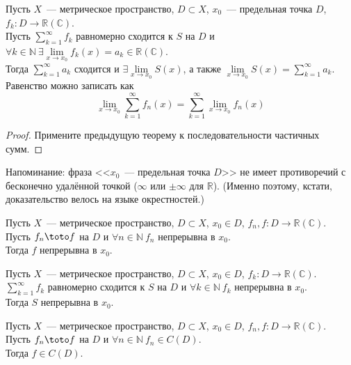 \documentclass{article}
\begin{document}
    \begin{theorem}
        Пусть $X$~--- метрическое пространство, $D\subset X$, $x_0$~--- предельная точка $D$, $f_k\colon D\to\mathbb R(\mathbb C)$.\\
        Пусть $\sum\limits_{k=1}^\infty f_k$ равномерно сходится к $S$ на $D$ и $\forall k\in\mathbb N~\exists\lim\limits_{x\to x_0}f_k(x)=a_k\in\mathbb R(\mathbb C)$.\\
        Тогда $\sum\limits_{k=1}^\infty a_k$ сходится и $\exists\lim\limits_{x\to x_0}S(x)$, а также $\lim\limits_{x\to x_0}S(x)=\sum\limits_{k=1}^\infty a_k$. Равенство можно записать как
        $$
        \lim\limits_{x\to x_0}\sum\limits_{k=1}^\infty f_n(x)=\sum\limits_{k=1}^\infty\lim\limits_{x\to x_0}f_n(x)
        $$
    \end{theorem}
    \begin{proof}
        Примените предыдущую теорему к последовательности частичных сумм.
    \end{proof}
    \begin{remark}
        Напоминание: фраза <<$x_0$~--- предельная точка $D$>> не имеет противоречий с бесконечно удалённой точкой ($\infty$ или $\pm\infty$ для $\mathbb R$). (Именно поэтому, кстати, доказательство велось на языке окрестностей.)
    \end{remark}
    \begin{corollary}
        \label{Непрерывность предельной функции в точке}
        Пусть $X$~--- метрическое пространство, $D\subset X$, $x_0\in D$, $f_n,f\colon D\to\mathbb R(\mathbb C)$.\\
        Пусть $f_n\toto f$ на $D$ и $\forall n\in\mathbb N~f_n$ непрерывна в $x_0$.\\
        Тогда $f$ непрерывна в $x_0$.
    \end{corollary}
    \begin{corollary}
        \label{Непрерывность cуммы ряда в точке}
        Пусть $X$~--- метрическое пространство, $D\subset X$, $x_0\in D$, $f_k\colon D\to\mathbb R(\mathbb C)$.\\
        $\sum\limits_{k=1}^\infty f_k$ равномерно сходится к $S$ на $D$ и $\forall k\in\mathbb N~f_k$ непрерывна в $x_0$.\\
        Тогда $S$ непрерывна в $x_0$.
    \end{corollary}
    \begin{corollary}
        \label{Непрерывность предельной функции на множестве}
        Пусть $X$~--- метрическое пространство, $D\subset X$, $x_0\in D$, $f_n,f\colon D\to\mathbb R(\mathbb C)$.\\
        Пусть $f_n\toto f$ на $D$ и $\forall n\in\mathbb N~f_n\in C(D)$.\\
        Тогда $f\in C(D)$.
    \end{corollary}
\end{document}
